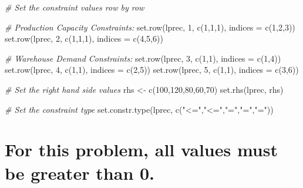 \documentclass[
]{article}
\newenvironment{Shaded}{\begin{snugshade}}{\end{snugshade}}
\newcommand{\AttributeTok}[1]{\textcolor[rgb]{0.77,0.63,0.00}{#1}}
\newcommand{\CommentTok}[1]{\textcolor[rgb]{0.56,0.35,0.01}{\textit{#1}}}
\newcommand{\DecValTok}[1]{\textcolor[rgb]{0.00,0.00,0.81}{#1}}
\newcommand{\FunctionTok}[1]{\textcolor[rgb]{0.00,0.00,0.00}{#1}}
\newcommand{\NormalTok}[1]{#1}
\newcommand{\OtherTok}[1]{\textcolor[rgb]{0.56,0.35,0.01}{#1}}
\newcommand{\StringTok}[1]{\textcolor[rgb]{0.31,0.60,0.02}{#1}}
\begin{document}
\begin{Shaded}
\begin{Highlighting}[]
\CommentTok{\# Set the constraint values row by row}

\CommentTok{\# Production Capacity Constraints:}
\FunctionTok{set.row}\NormalTok{(lprec, }\DecValTok{1}\NormalTok{, }\FunctionTok{c}\NormalTok{(}\DecValTok{1}\NormalTok{,}\DecValTok{1}\NormalTok{,}\DecValTok{1}\NormalTok{), }\AttributeTok{indices =} \FunctionTok{c}\NormalTok{(}\DecValTok{1}\NormalTok{,}\DecValTok{2}\NormalTok{,}\DecValTok{3}\NormalTok{))}
\FunctionTok{set.row}\NormalTok{(lprec, }\DecValTok{2}\NormalTok{, }\FunctionTok{c}\NormalTok{(}\DecValTok{1}\NormalTok{,}\DecValTok{1}\NormalTok{,}\DecValTok{1}\NormalTok{), }\AttributeTok{indices =} \FunctionTok{c}\NormalTok{(}\DecValTok{4}\NormalTok{,}\DecValTok{5}\NormalTok{,}\DecValTok{6}\NormalTok{))}

\CommentTok{\# Warehouse Demand Constraints:}
\FunctionTok{set.row}\NormalTok{(lprec, }\DecValTok{3}\NormalTok{, }\FunctionTok{c}\NormalTok{(}\DecValTok{1}\NormalTok{,}\DecValTok{1}\NormalTok{), }\AttributeTok{indices =} \FunctionTok{c}\NormalTok{(}\DecValTok{1}\NormalTok{,}\DecValTok{4}\NormalTok{))}
\FunctionTok{set.row}\NormalTok{(lprec, }\DecValTok{4}\NormalTok{, }\FunctionTok{c}\NormalTok{(}\DecValTok{1}\NormalTok{,}\DecValTok{1}\NormalTok{), }\AttributeTok{indices =} \FunctionTok{c}\NormalTok{(}\DecValTok{2}\NormalTok{,}\DecValTok{5}\NormalTok{))}
\FunctionTok{set.row}\NormalTok{(lprec, }\DecValTok{5}\NormalTok{, }\FunctionTok{c}\NormalTok{(}\DecValTok{1}\NormalTok{,}\DecValTok{1}\NormalTok{), }\AttributeTok{indices =} \FunctionTok{c}\NormalTok{(}\DecValTok{3}\NormalTok{,}\DecValTok{6}\NormalTok{))}

\CommentTok{\# Set the right hand side values}
\NormalTok{rhs }\OtherTok{\textless{}{-}} \FunctionTok{c}\NormalTok{(}\DecValTok{100}\NormalTok{,}\DecValTok{120}\NormalTok{,}\DecValTok{80}\NormalTok{,}\DecValTok{60}\NormalTok{,}\DecValTok{70}\NormalTok{)}
\FunctionTok{set.rhs}\NormalTok{(lprec, rhs)}

\CommentTok{\# Set the constraint type}
\FunctionTok{set.constr.type}\NormalTok{(lprec, }\FunctionTok{c}\NormalTok{(}\StringTok{"\textless{}="}\NormalTok{,}\StringTok{"\textless{}="}\NormalTok{,}\StringTok{"="}\NormalTok{,}\StringTok{"="}\NormalTok{,}\StringTok{"="}\NormalTok{))}
\end{Highlighting}
\end{Shaded}

\hypertarget{for-this-problem-all-values-must-be-greater-than-0.}{%
\section{For this problem, all values must be greater than
0.}\label{for-this-problem-all-values-must-be-greater-than-0.}}
\end{document}
